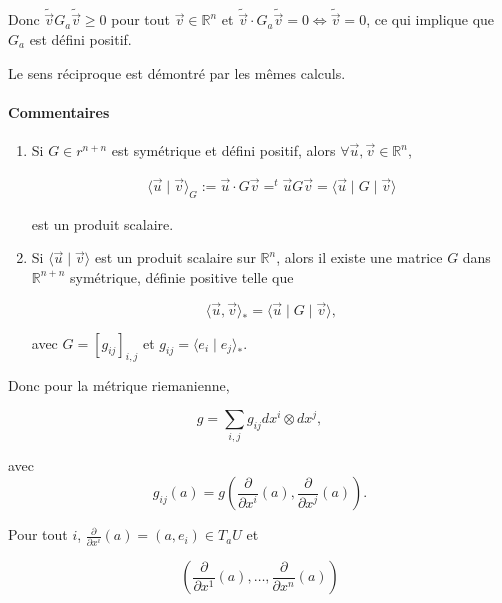 \documentclass[french]{article}
\theoremstyle{definition}
\theoremstyle{remark}
\begin{document}
Donc \(\tilde{\overrightarrow{v}} G_a \tilde{\overrightarrow{v}} \geq 0\) pour tout \(\overrightarrow{v} \in \mathbb{R}^n\) et \(\tilde{\overrightarrow{v}} \cdot G_a \tilde{\overrightarrow{v}} = 0 \iff \tilde{\overrightarrow{v}} = 0\), ce qui implique que \(G_a\) est défini positif.

Le sens réciproque est démontré par les mêmes calculs.

\paragraph{Commentaires}

\begin{enumerate}
  \item Si \(G \in r ^{n+n}\) est symétrique et défini positif, alors \(\forall \overrightarrow{u}, \overrightarrow{v} \in \mathbb{R}^n\),

  \begin{gather*}
    \langle \overrightarrow{u} \mid \overrightarrow{v} \rangle _{G} := \overrightarrow{u} \cdot G \overrightarrow{v} = ^{t} \overrightarrow{u} G \overrightarrow{v} = \langle \overrightarrow{u} \mid G \mid \overrightarrow{v} \rangle
  \end{gather*}

  est un produit scalaire.

  \item Si \(\langle \overrightarrow{u} \mid \overrightarrow{v} \rangle \) est un produit scalaire sur \(\mathbb{R}^n\), alors il existe une matrice \(G\) dans \(\mathbb{R} ^{n+n}\) symétrique, définie positive telle que

  \[\langle \overrightarrow{u},\overrightarrow{v} \rangle _{*} = \langle \overrightarrow{u} \mid G \mid \overrightarrow{v} \rangle,  \]

  avec \(G = [g _{ij}] _{i,j}\) et \(g _{ij} = \langle e _{i} \mid e _{j} \rangle _{*} \).
\end{enumerate}

Donc pour la métrique riemanienne,

\[g = \sum_{i,j} g _{ij} d x^{i} \otimes d x^{j}, \]

avec \[g _{ij}(a) = g \left(\frac{\partial  }{\partial x ^{i}}(a), \frac{\partial  }{\partial x ^{j}}(a)\right).\]

Pour tout \(i\), \(\frac{\partial  }{\partial x ^{i}}(a) = (a, e_i) \in T_a U\) et

\[\left(\frac{\partial  }{\partial x ^{1}}(a), \dots, \frac{\partial  }{\partial x ^{n}}(a)\right)\]
\end{document}
